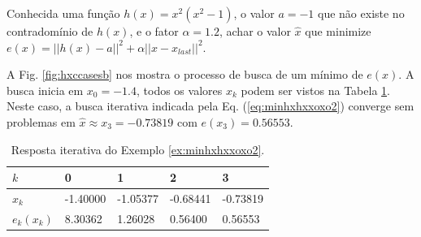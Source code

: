 \begin{example}\label{ex:minhxhxxoxo2}
Conhecida uma função $h(x)=x^2(x^2-1)$, o valor $a=-1$ que não existe no contradomínio de $h(x)$,
e o fator $\alpha=1.2$,
achar o valor $\hat{x}$ que minimize $e(x)=||h(x)-a||^2+\alpha||x-x_{last}||^2$.
\end{example}
\begin{SolutionT}\label{sol:minhxhxxoxo2}
 A Fig. \ref{fig:hxccasesb} nos mostra o processo de busca de um mínimo
 de $e(x)$. A busca inicia em $x_0=-1.4$,
 todos os valores $x_{k}$ podem ser vistos na Tabela \ref{tab:hxccases2}. 
Neste caso, a busca iterativa indicada pela Eq. (\ref{eq:minhxhxxoxo2}) converge sem problemas 
em $\hat{x}\approx x_3 =-0.73819$ com $e(x_3)=0.56553$.
\end{SolutionT}

\begin{table}[!h]
\centering
\begin{tabular}{|l|l|l|l|l|}
\hline
$k$      & 0 & 1 & 2 & 3 \\ \hline
$x_k$    & -1.40000 & -1.05377 & -0.68441 & -0.73819 \\ \hline
$e_k(x_k)$ & 8.30362 &  1.26028 &  0.56400 &  0.56553 \\ \hline
\end{tabular}
\caption{Resposta iterativa do Exemplo \ref{ex:minhxhxxoxo2}.}
\label{tab:hxccases2}
\end{table}

